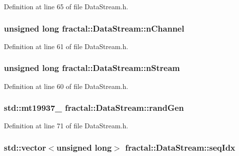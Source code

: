 Definition at line 65 of file Data\+Stream.\+h.

\hypertarget{classfractal_1_1DataStream_a5af9425ea6fd0951e8354bba788c0b44}{
\subsubsection[{n\+Channel}]{\setlength{\rightskip}{0pt plus 5cm}unsigned long fractal\+::\+Data\+Stream\+::n\+Channel\hspace{0.3cm}{\ttfamily [protected]}}}\label{classfractal_1_1DataStream_a5af9425ea6fd0951e8354bba788c0b44}


Definition at line 61 of file Data\+Stream.\+h.

\hypertarget{classfractal_1_1DataStream_aad7f2cba4a0f2fde83daa29465f81d13}{
\subsubsection[{n\+Stream}]{\setlength{\rightskip}{0pt plus 5cm}unsigned long fractal\+::\+Data\+Stream\+::n\+Stream\hspace{0.3cm}{\ttfamily [protected]}}}\label{classfractal_1_1DataStream_aad7f2cba4a0f2fde83daa29465f81d13}


Definition at line 60 of file Data\+Stream.\+h.

\hypertarget{classfractal_1_1DataStream_a31caefa3fd9d99bbe0b8a19191687b53}{
\subsubsection[{rand\+Gen}]{\setlength{\rightskip}{0pt plus 5cm}std\+::mt19937\+\_ fractal\+::\+Data\+Stream\+::rand\+Gen\hspace{0.3cm}{\ttfamily [protected]}}}\label{classfractal_1_1DataStream_a31caefa3fd9d99bbe0b8a19191687b53}


Definition at line 71 of file Data\+Stream.\+h.

\hypertarget{classfractal_1_1DataStream_acecf5629e8c466ef8dc7b4570decb247}{
\subsubsection[{seq\+Idx}]{\setlength{\rightskip}{0pt plus 5cm}std\+::vector$<$unsigned long$>$ fractal\+::\+Data\+Stream\+::seq\+Idx\hspace{0.3cm}{\ttfamily [protected]}}}\label{classfractal_1_1DataStream_acecf5629e8c466ef8dc7b4570decb247}



